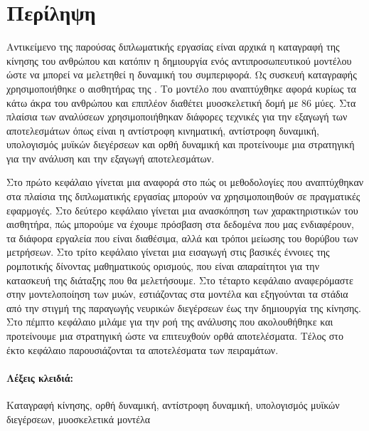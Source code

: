\section*{Περίληψη}

Αντικείμενο της παρούσας διπλωματικής εργασίας είναι αρχικά η καταγραφή της κίνησης του ανθρώπου και κατόπιν η δημιουργία ενός αντιπροσωπευτικού μοντέλου ώστε να μπορεί να μελετηθεί η δυναμική του συμπεριφορά. Ως συσκευή καταγραφής χρησιμοποιήθηκε ο αισθητήρας  της . Το μοντέλο που αναπτύχθηκε αφορά κυρίως τα κάτω άκρα του ανθρώπου και επιπλέον διαθέτει μυοσκελετική δομή με 86 μύες. Στα πλαίσια των αναλύσεων χρησιμοποιήθηκαν διάφορες τεχνικές για την εξαγωγή των αποτελεσμάτων όπως είναι η αντίστροφη κινηματική, αντίστροφη δυναμική, υπολογισμός μυϊκών διεγέρσεων και ορθή δυναμική και προτείνουμε μια στρατηγική για την ανάλυση και την εξαγωγή αποτελεσμάτων.

Στο πρώτο κεφάλαιο γίνεται μια αναφορά στο πώς οι μεθοδολογίες που αναπτύχθηκαν στα πλαίσια της διπλωματικής εργασίας μπορούν να χρησιμοποιηθούν σε πραγματικές εφαρμογές. Στο δεύτερο κεφάλαιο γίνεται μια ανασκόπηση των χαρακτηριστικών του αισθητήρα, πώς μπορούμε να έχουμε πρόσβαση στα δεδομένα που μας ενδιαφέρουν, τα διάφορα εργαλεία που είναι διαθέσιμα, αλλά και τρόποι μείωσης του θορύβου των μετρήσεων. Στο τρίτο κεφάλαιο γίνεται μια εισαγωγή στις βασικές έννοιες της ρομποτικής δίνοντας μαθηματικούς ορισμούς, που είναι απαραίτητοι για την κατασκευή της διάταξης που θα μελετήσουμε. Στο τέταρτο κεφάλαιο αναφερόμαστε στην μοντελοποίηση των μυών, εστιάζοντας στα μοντέλα  και εξηγούνται τα στάδια από την στιγμή της παραγωγής νευρικών διεγέρσεων έως την δημιουργία της κίνησης. Στο πέμπτο κεφάλαιο μιλάμε για την ροή της ανάλυσης που ακολουθήθηκε και προτείνουμε μια στρατηγική ώστε να επιτευχθούν ορθά αποτελέσματα. Τέλος στο έκτο κεφάλαιο παρουσιάζονται τα αποτελέσματα των πειραμάτων.

\vfill

\paragraph{\textbf{Λέξεις κλειδιά:}}Καταγραφή κίνησης, ορθή δυναμική, αντίστροφη δυναμική, υπολογισμός μυϊκών διεγέρσεων, μυοσκελετικά μοντέλα

\thispagestyle{empty}
\clearpage\mbox{}
\thispagestyle{empty}
\clearpage

